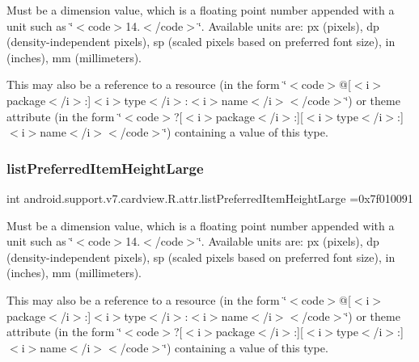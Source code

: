 Must be a dimension value, which is a floating point number appended with a unit such as \char`\"{}$<$code$>$14.\+5sp$<$/code$>$\char`\"{}. Available units are\+: px (pixels), dp (density-\/independent pixels), sp (scaled pixels based on preferred font size), in (inches), mm (millimeters). 

This may also be a reference to a resource (in the form \char`\"{}$<$code$>$@\mbox{[}$<$i$>$package$<$/i$>$\+:\mbox{]}$<$i$>$type$<$/i$>$\+:$<$i$>$name$<$/i$>$$<$/code$>$\char`\"{}) or theme attribute (in the form \char`\"{}$<$code$>$?\mbox{[}$<$i$>$package$<$/i$>$\+:\mbox{]}\mbox{[}$<$i$>$type$<$/i$>$\+:\mbox{]}$<$i$>$name$<$/i$>$$<$/code$>$\char`\"{}) containing a value of this type. \mbox{\label{classandroid_1_1support_1_1v7_1_1cardview_1_1R_1_1attr_a8fc05e30e3bec2d22a56a586b5306a3b}} 
\subsubsection{\texorpdfstring{list\+Preferred\+Item\+Height\+Large}{listPreferredItemHeightLarge}}
{\footnotesize\ttfamily int android.\+support.\+v7.\+cardview.\+R.\+attr.\+list\+Preferred\+Item\+Height\+Large =0x7f010091\hspace{0.3cm}{\ttfamily [static]}}

Must be a dimension value, which is a floating point number appended with a unit such as \char`\"{}$<$code$>$14.\+5sp$<$/code$>$\char`\"{}. Available units are\+: px (pixels), dp (density-\/independent pixels), sp (scaled pixels based on preferred font size), in (inches), mm (millimeters). 

This may also be a reference to a resource (in the form \char`\"{}$<$code$>$@\mbox{[}$<$i$>$package$<$/i$>$\+:\mbox{]}$<$i$>$type$<$/i$>$\+:$<$i$>$name$<$/i$>$$<$/code$>$\char`\"{}) or theme attribute (in the form \char`\"{}$<$code$>$?\mbox{[}$<$i$>$package$<$/i$>$\+:\mbox{]}\mbox{[}$<$i$>$type$<$/i$>$\+:\mbox{]}$<$i$>$name$<$/i$>$$<$/code$>$\char`\"{}) containing a value of this type. \mbox{\label{classandroid_1_1support_1_1v7_1_1cardview_1_1R_1_1attr_aa08a6c18bbbeafe82c27115aad7a9682}} 
